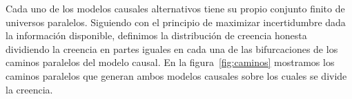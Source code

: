 \documentclass[a4paper,11pt]{book}
\theoremstyle{definition}
\begin{document}
%


Cada uno de los modelos causales alternativos tiene su propio conjunto finito de universos paralelos.
%
Siguiendo con el principio de maximizar incertidumbre dada la información disponible, definimos la distribución de creencia honesta dividiendo la creencia en partes iguales en cada una de las bifurcaciones de los caminos paralelos del modelo causal.
%
En la figura~\ref{fig:caminos} mostramos los caminos paralelos que generan ambos modelos causales sobre los cuales se divide la creencia.

\end{document}
